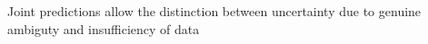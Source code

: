 \documentclass[preview]{standalone}
\begin{document}
\begin{center}
Joint predictions allow the distinction between uncertainty due to genuine ambiguty and insufficiency of data
\end{center}
\end{document}
